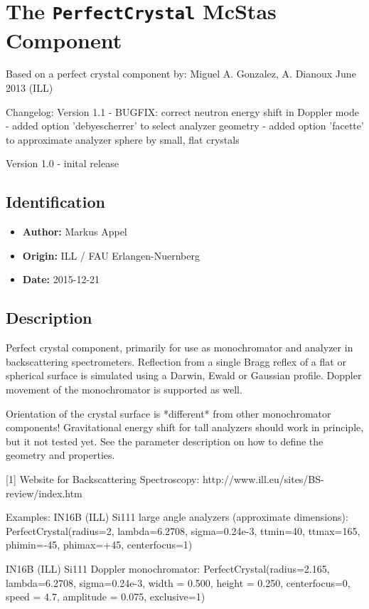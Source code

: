\section{The \texttt{PerfectCrystal} McStas Component}
Based on a perfect crystal component by: Miguel A. Gonzalez, A. Dianoux June 2013 (ILL)

Changelog:
Version 1.1
- BUGFIX: correct neutron energy shift in Doppler mode
- added option 'debyescherrer' to select analyzer geometry
- added option 'facette' to approximate analyzer sphere by small, flat crystals

Version 1.0
- inital release

\subsection*{Identification}
\begin{itemize}
  \item \textbf{Author:} Markus Appel
  \item \textbf{Origin:} ILL / FAU Erlangen-Nuernberg
  \item \textbf{Date:} 2015-12-21
\end{itemize}

\subsection*{Description}
Perfect crystal component, primarily for use as monochromator and analyzer in backscattering spectrometers. Reflection from a single Bragg reflex of a flat or spherical surface is simulated using a Darwin, Ewald or Gaussian profile. Doppler movement of the monochromator is supported as well.

Orientation of the crystal surface is *different* from other monochromator components! Gravitational energy shift for tall analyzers should work in principle, but it not tested yet. See the parameter description on how to define the geometry and properties.

[1] Website for Backscattering Spectroscopy: http://www.ill.eu/sites/BS-review/index.htm

Examples: IN16B (ILL) Si111 large angle analyzers (approximate dimensions): PerfectCrystal(radius=2, lambda=6.2708, sigma=0.24e-3, ttmin=40, ttmax=165, phimin=-45, phimax=+45, centerfocus=1)

IN16B (ILL) Si111 Doppler monochromator: PerfectCrystal(radius=2.165, lambda=6.2708, sigma=0.24e-3, width = 0.500, height = 0.250, centerfocus=0, speed = 4.7, amplitude = 0.075, exclusive=1)

